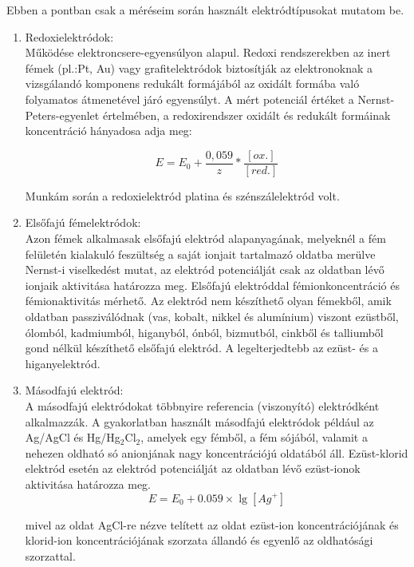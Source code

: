 Ebben a pontban csak a méréseim során használt elektródtípusokat mutatom be.
\begin{enumerate}
\item Redoxielektródok:\\
Működése elektroncsere-egyensúlyon alapul. Redoxi rendszerekben az inert fémek (pl.:Pt, Au) vagy grafitelektródok biztosítják az elektronoknak a vizsgálandó komponens redukált formájából az oxidált formába való folyamatos átmenetével járó egyensúlyt. A mért potenciál értéket a Nernst-Peters-egyenlet értelmében, a redoxirendszer oxidált és redukált formáinak koncentráció hányadosa adja meg:

\begin{equation}
E= E_\text{0} + \frac{0,059}{z} * \frac{[ox.]}{[red.]}
\end{equation}

Munkám során a redoxielektród platina és szénszálelektród volt.
\item Elsőfajú fémelektródok:\\
Azon fémek alkalmasak elsőfajú elektród alapanyagának, melyeknél a  fém felületén kialakuló feszültség a saját ionjait tartalmazó oldatba merülve Nernst-i viselkedést mutat, az elektród potenciálját csak az oldatban lévő ionjaik aktivitása határozza meg. Elsőfajú elektróddal fémionkoncentráció és fémionaktivitás mérhető. Az elektród nem készíthető olyan fémekből, amik oldatban passziválódnak (vas, kobalt, nikkel és alumínium) viszont ezüstből, ólomból, kadmiumból, higanyból, ónból, bizmutból, cinkből és talliumből gond nélkül készíthető elsőfajú elektród. A legelterjedtebb az ezüst- és a higanyelektród.

\item Másodfajú elektród: \cite{pfreisich1960}\\
A másodfajú elektródokat többnyire referencia (viszonyító) elektródként alkalmazzák. A gyakorlatban használt másodfajú elektródok például az Ag/AgCl és Hg/Hg$_2$Cl$_2$, amelyek egy fémből, a fém sójából, valamit a nehezen oldható só anionjának nagy koncentrációjú oldatából áll. Ezüst-klorid elektród esetén az elektród potenciálját az oldatban lévő ezüst-ionok aktivitása határozza meg.\\

\begin{equation}
E = E_0 + 0.059 \times \lg [Ag^+]
\end{equation}

mivel az oldat AgCl-re nézve telített az oldat ezüst-ion koncentrációjának és klorid-ion koncentrációjának szorzata állandó és egyenlő az oldhatósági szorzattal.\\


\end{enumerate}
